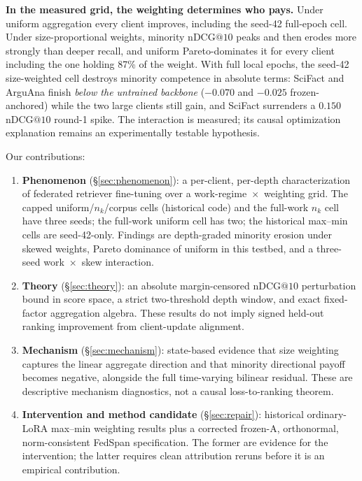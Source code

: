 \documentclass[sigconf,anonymous,review]{acmart}
\makeatletter
\newcommand{\ndcg}{\mathrm{nDCG@10}}
\makeatother
\begin{document}
\textbf{In the measured grid, the weighting determines who pays.} Under uniform aggregation every client improves, including the seed-42 full-epoch cell. Under size-proportional weights, minority $\ndcg$ peaks and then erodes more strongly than deeper recall, and uniform Pareto-dominates it for every client including the one holding 87\% of the weight. With full local epochs, the seed-42 size-weighted cell destroys minority competence in absolute terms: SciFact and ArguAna finish \emph{below the untrained backbone} ($-0.070$ and $-0.025$ frozen-anchored) while the two large clients still gain, and SciFact surrenders a $0.150$ $\ndcg$ round-1 spike. The interaction is measured; its causal optimization explanation remains an experimentally testable hypothesis.

Our contributions:
\begin{enumerate}
\item \textbf{Phenomenon} (\S\ref{sec:phenomenon}): a per-client, per-depth characterization of federated retriever fine-tuning over a work-regime~$\times$~weighting grid. The capped uniform/$n_k$/corpus cells (historical code) and the full-work $n_k$ cell have three seeds; the full-work uniform cell has two; the historical max--min cells are seed-42-only. Findings are depth-graded minority erosion under skewed weights, Pareto dominance of uniform in this testbed, and a three-seed work~$\times$~skew interaction.
\item \textbf{Theory} (\S\ref{sec:theory}): an absolute margin-censored $\ndcg$ perturbation bound in score space, a strict two-threshold depth window, and exact fixed-factor aggregation algebra. These results do not imply signed held-out ranking improvement from client-update alignment.
\item \textbf{Mechanism} (\S\ref{sec:mechanism}): state-based evidence that size weighting captures the linear aggregate direction and that minority directional payoff becomes negative, alongside the full time-varying bilinear residual. These are descriptive mechanism diagnostics, not a causal loss-to-ranking theorem.
\item \textbf{Intervention and method candidate} (\S\ref{sec:repair}): historical ordinary-LoRA max--min weighting results plus a corrected frozen-A, orthonormal, norm-consistent FedSpan specification. The former are evidence for the intervention; the latter requires clean attribution reruns before it is an empirical contribution.
\end{enumerate}
\end{document}
